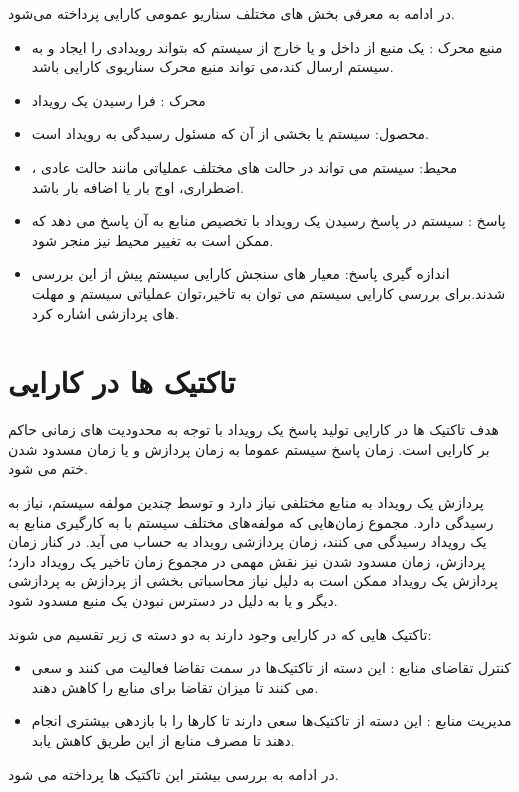 در ادامه به معرفی بخش های مختلف سناریو عمومی کارایی پرداخته می‌شود.
\begin{itemize}
\item
منبع محرک :
یک منبع از داخل و یا خارج از سیستم که بتواند رویدادی را ایجاد و به سیستم ارسال کند،‌می تواند منبع محرک سناریوی کارایی باشد.
\item
محرک : 
فرا رسیدن یک رویداد
\item
محصول: سیستم یا بخشی از آن که مسئول رسیدگی به رویداد است.
\item
محیط:
سیستم می تواند در حالت های مختلف عملیاتی مانند حالت عادی ، اضطراری، اوج بار یا اضافه بار باشد.
\item
پاسخ :
سیستم در پاسخ رسیدن یک رویداد با تخصیص منابع به آن پاسخ می دهد که ممکن است به تغییر محیط نیز منجر شود.
\item
اندازه گیری پاسخ:
معیار های سنجش کارایی سیستم پیش از این بررسی شدند.برای بررسی کارایی سیستم می توان به تاخیر،‌توان عملیاتی سیستم و مهلت های پردازشی اشاره کرد.
\end{itemize}

\section{تاکتیک ها در کارایی}
هدف تاکتیک ها در کارایی تولید پاسخ یک رویداد با توجه به محدودیت های زمانی حاکم بر کارایی است. زمان پاسخ سیستم عموما به زمان پردازش و یا زمان مسدود شدن  ختم می شود.

پردازش یک رویداد به منابع مختلفی نیاز دارد و توسط چندین مولفه سیستم، نیاز به رسیدگی دارد. مجموع زمان‌هایی که مولفه‌های مختلف سیستم با به کار‌گیری منابع به یک رویداد رسیدگی می کنند،‌ زمان پردازشی رویداد به حساب می آید. در کنار زمان پردازش، زمان مسدود شدن نیز نقش مهمی در مجموع زمان تاخیر یک رویداد دارد؛ پردازش یک رویداد ممکن است به دلیل نیاز محاسباتی بخشی از پردازش به پردازشی دیگر و یا به دلیل در دسترس نبودن یک منبع مسدود شود.

تاکتیک هایی که در کارایی وجود دارند به دو دسته ی زیر تقسیم می شوند:
\begin{itemize}
\item
کنترل تقاضای منابع : این دسته از تاکتیک‌ها در سمت تقاضا فعالیت می کنند و سعی می کنند تا میزان تقاضا برای منابع را کاهش دهند.
\item
مدیریت منابع : این دسته از تاکتیک‌ها سعی دارند تا کار‌ها را با بازدهی بیشتری انجام دهند تا مصرف منابع از این طریق کاهش یابد.
\end{itemize}
در ادامه به بررسی بیشتر این تاکتیک ها پرداخته می شود.
